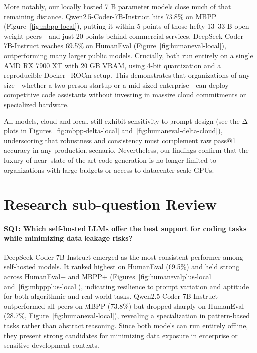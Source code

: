 More notably, our locally hosted 7 B parameter models close much of that remaining distance. Qwen2.5-Coder-7B-Instruct hits 73.8\% on MBPP (Figure~\ref{fig:mbpp-local}), putting it within 5 points of those hefty 13–33 B open-weight peers—and just 20 points behind commercial services. DeepSeek-Coder-7B-Instruct reaches 69.5\% on HumanEval (Figure~\ref{fig:humaneval-local}), outperforming many larger public models. Crucially, both run entirely on a single AMD RX 7900 XT with 20 GB VRAM, using 4-bit quantization and a reproducible Docker+ROCm setup. This demonstrates that organizations of any size—whether a two-person startup or a mid-sized enterprise—can deploy competitive code assistants without investing in massive cloud commitments or specialized hardware.

All models, cloud and local, still exhibit sensitivity to prompt design (see the Δ plots in Figures~\ref{fig:mbpp-delta-local} and~\ref{fig:humaneval-delta-cloud}), underscoring that robustness and consistency must complement raw pass@1 accuracy in any production scenario. Nevertheless, our findings confirm that the luxury of near–state-of-the-art code generation is no longer limited to organizations with large budgets or access to datacenter-scale GPUs.

\section{Research sub-question Review}

\paragraph{SQ1: Which self-hosted LLMs offer the best support for coding tasks while minimizing data leakage risks?}
DeepSeek-Coder-7B-Instruct emerged as the most consistent performer among self-hosted models. It ranked highest on HumanEval (69.5\%) and held strong across HumanEval+ and MBPP+ (Figures~\ref{fig:humanevalplus-local} and~\ref{fig:mbppplus-local}), indicating resilience to prompt variation and aptitude for both algorithmic and real-world tasks. Qwen2.5-Coder-7B-Instruct outperformed all peers on MBPP (73.8\%) but dropped sharply on HumanEval (28.7\%, Figure~\ref{fig:humaneval-local}), revealing a specialization in pattern-based tasks rather than abstract reasoning. Since both models can run entirely offline, they present strong candidates for minimizing data exposure in enterprise or sensitive development contexts.

